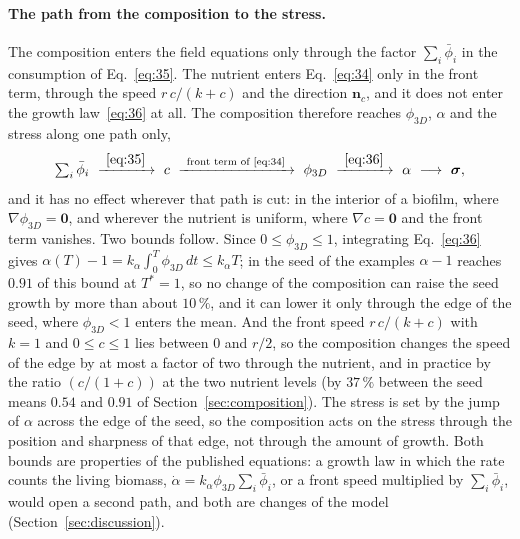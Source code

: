 \documentclass[11pt,a4paper]{article}
\newcommand{\phiD}{\phi_{3D}}
\newcommand{\lv}{\textstyle\sum_i\bar\phi_i}
\newcommand{\nc}{\mathbf n_c}
\begin{document}
\paragraph{The path from the composition to the stress.} The composition enters the field equations only through the factor $\lv$ in the consumption of Eq.~\eqref{eq:35}. The nutrient enters Eq.~\eqref{eq:34} only in the front term, through the speed $r\,c/(k+c)$ and the direction $\nc$, and it does not enter the growth law~\eqref{eq:36} at all. The composition therefore reaches $\phiD$, $\alpha$ and the stress along one path only,
\begin{equation}
\lv\ \xrightarrow{\ \eqref{eq:35}\ }\ c\ \xrightarrow{\ \text{front term of \eqref{eq:34}}\ }\ \phiD\ \xrightarrow{\ \eqref{eq:36}\ }\ \alpha\ \longrightarrow\ \boldsymbol\sigma,
\label{eq:path}
\end{equation}
and it has no effect wherever that path is cut: in the interior of a biofilm, where $\nabla\phiD=\mathbf 0$, and wherever the nutrient is uniform, where $\nabla c=\mathbf 0$ and the front term vanishes. Two bounds follow. Since $0\le\phiD\le1$, integrating Eq.~\eqref{eq:36} gives $\alpha(T)-1=k_\alpha\int_0^T\phiD\,dt\le k_\alpha T$; in the seed of the examples $\alpha-1$ reaches $0.91$ of this bound at $T^*=1$, so no change of the composition can raise the seed growth by more than about $10\,\%$, and it can lower it only through the edge of the seed, where $\phiD<1$ enters the mean. And the front speed $r\,c/(k+c)$ with $k=1$ and $0\le c\le1$ lies between $0$ and $r/2$, so the composition changes the speed of the edge by at most a factor of two through the nutrient, and in practice by the ratio $(c/(1+c))$ at the two nutrient levels (by $37\,\%$ between the seed means $0.54$ and $0.91$ of Section~\ref{sec:composition}). The stress is set by the jump of $\alpha$ across the edge of the seed, so the composition acts on the stress through the position and sharpness of that edge, not through the amount of growth. Both bounds are properties of the published equations: a growth law in which the rate counts the living biomass, $\dot\alpha=k_\alpha\phiD\lv$, or a front speed multiplied by $\lv$, would open a second path, and both are changes of the model (Section~\ref{sec:discussion}).
\end{document}
